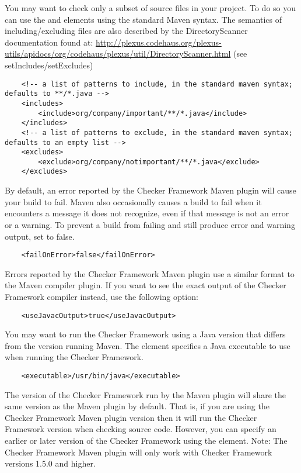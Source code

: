 \begin{enumerate}
{You may want to check only a subset of source files in your project.  To do so you can use the  and 
elements using the standard Maven syntax.  The semantics of including/excluding files are also described
by the DirectoryScanner documentation found at:
\url{http://plexus.codehaus.org/plexus-utils/apidocs/org/codehaus/plexus/util/DirectoryScanner.html} (see setIncludes/setExcludes)

\begin{Verbatim}
    <!-- a list of patterns to include, in the standard maven syntax; defaults to **/*.java -->
    <includes>
        <include>org/company/important/**/*.java</include>
    </includes>
    <!-- a list of patterns to exclude, in the standard maven syntax; defaults to an empty list -->
    <excludes>
        <exclude>org/company/notimportant/**/*.java</exclude>
    </excludes>
\end{Verbatim}

By default, an error reported by the Checker Framework Maven plugin will cause your build to fail.
Maven also occasionally causes a build to fail when it encounters a message it does not recognize,
even if that message is not an error or a warning. To prevent a build from failing and still produce
error and warning output, set  to false.

\begin{Verbatim}
    <failOnError>false</failOnError>
\end{Verbatim}

Errors reported by the Checker Framework Maven plugin use a similar format to the Maven compiler plugin. If
you want to see the exact output of the Checker Framework compiler instead, use the following option:

\begin{Verbatim}
    <useJavacOutput>true</useJavacOutput>
\end{Verbatim}

You may want to run the Checker Framework using a Java version that differs from the version running Maven.  The
 element specifies a Java executable to use when running the Checker Framework.

\begin{Verbatim}
    <executable>/usr/bin/java</executable>
\end{Verbatim}

The version of the Checker Framework run by the Maven plugin will share the same version as the Maven plugin
by default.  That is, if you are using the Checker Framework Maven plugin version \ReleaseVersion{} then it will run the
Checker Framework version \ReleaseVersion{} when checking source code.  However, you can specify an earlier
or later version of the Checker Framework using the  element.
Note: The Checker Framework Maven plugin will only work with Checker Framework versions 1.5.0 and higher.

}
\end{enumerate}
